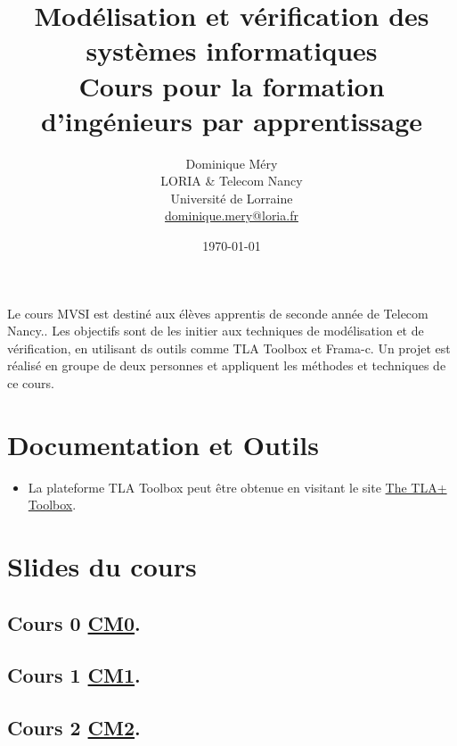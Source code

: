 \documentclass[ 12pt]{article}
\title{Modélisation et vérification des systèmes informatiques\\
Cours  pour la formation d'ingénieurs par apprentissage}
\author{Dominique M\'ery\\
LORIA \& Telecom Nancy\\ Universit\'e de Lorraine\\ \url{dominique.mery@loria.fr}}
\date{\today}
\begin{document}
\begin{tcolorbox}



  \setcounter{ex}{1}
\maketitle

Le cours MVSI  est destiné aux élèves apprentis de seconde année  de
Telecom Nancy..
Les objectifs sont de les initier aux techniques de modélisation et
de vérification, en utilisant ds outils comme TLA Toolbox et Frama-c.
Un projet est réalisé  en groupe de deux personnes et appliquent  les
méthodes  et techniques de ce cours.



  \tableofcontents

\section{Documentation et Outils}




\begin{itemize}

  
\item La plateforme TLA Toolbox peut être  obtenue en visitant le site  \href{https://lamport.azurewebsites.net/tla/toolbox.html}{The TLA+ Toolbox}.


  
\end{itemize}


\section{Slides du cours}
\label{sec:course-mcfsi-at}




\subsection{Cours 0
  \href{http://mery54.github.io/teaching/mvsi/lecturesnotes/mvsilecture0.pdf}{CM0}. }




\subsection{Cours 1
  \href{http://mery54.github.io/teaching/mvsi/lecturesnotes/mvsilecture1.pdf}{CM1}. }


\subsection{Cours 2
  \href{http://mery54.github.io/teaching/mvsi/lecturesnotes/mvsilecture2.pdf}{CM2}. }



\end{tcolorbox}
\end{document}

